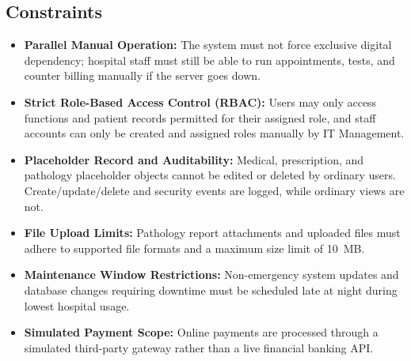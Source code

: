 \documentclass[11pt,a4paper]{article}
\begin{document}
\subsection{Constraints}
\begin{itemize}
    \item \textbf{Parallel Manual Operation:} The system must not force exclusive digital dependency; hospital staff must still be able to run appointments, tests, and counter billing manually if the server goes down.

    \item \textbf{Strict Role-Based Access Control (RBAC):} Users may only access functions and patient records permitted for their assigned role, and staff accounts can only be created and assigned roles manually by IT Management.

    \item \textbf{Placeholder Record and Auditability:} Medical, prescription, and pathology placeholder objects cannot be edited or deleted by ordinary users. Create/update/delete and security events are logged, while ordinary views are not.

    \item \textbf{File Upload Limits:} Pathology report attachments and uploaded files must adhere to supported file formats and a maximum size limit of 10~MB.

    \item \textbf{Maintenance Window Restrictions:} Non-emergency system updates and database changes requiring downtime must be scheduled late at night during lowest hospital usage.

    \item \textbf{Simulated Payment Scope:} Online payments are processed through a simulated third-party gateway rather than a live financial banking API.
\end{itemize}
\end{document}
